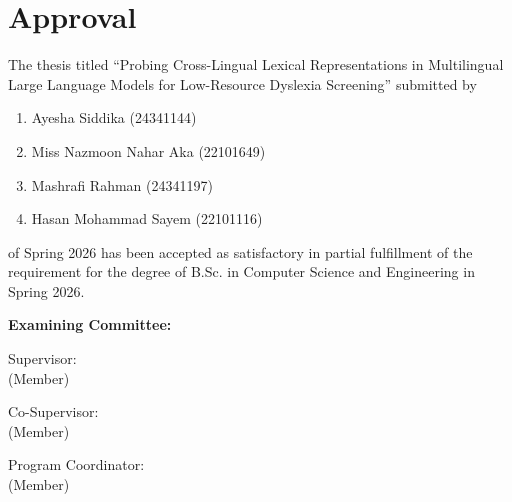 \section*{Approval}

The thesis titled ``Probing Cross-Lingual Lexical Representations in Multilingual Large Language Models for Low-Resource Dyslexia Screening'' submitted by
\begin{enumerate}
  \item Ayesha Siddika (24341144)
  \item Miss Nazmoon Nahar Aka (22101649)
  \item Mashrafi Rahman (24341197)
  \item Hasan Mohammad Sayem (22101116)
\end{enumerate}

of Spring 2026 has been accepted as satisfactory in partial fulfillment of the requirement for the degree of B.Sc. in Computer Science and Engineering in Spring 2026.

\vspace{0.5cm}
\textbf{Examining Committee:}

\vspace{1cm}

Supervisor:\\
(Member)
\begin{center}
    \hspace{7cm}  \hspace{1cm}
\end{center}

Co-Supervisor:\\
(Member)
\begin{center}
    \hspace{7cm}  \hspace{1cm}
\end{center}
\newpage
Program Coordinator:\\
(Member)
\begin{center}
    \hspace{7cm}  \hspace{1cm}
\end{center}

